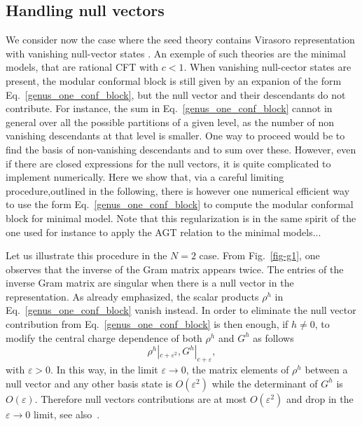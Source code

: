 \documentclass[a4paper,11pt]{article}
\begin{document}
\subsection{Handling null vectors}
\label{null_vec1}
We consider now the case where the seed theory contains Virasoro representation with vanishing null-vector states \cite{BPZ}. 
An exemple of such theories are the minimal models, that are rational CFT with $c<1$.  
When vanishing null-cector states are present, the modular conformal block is  still given by an expanion of the form Eq.~\eqref{genus_one_conf_block}, but the null vector and their descendants do not contribute. For instance,  the sum in Eq.~\eqref{genus_one_conf_block} cannot in general over all the possible partitions of a given level, as the number of non vanishing descendants at that level is smaller. One way to proceed would be to find the basis of non-vanishing descendants and to sum over these. 
However, even if there are closed expressions for the null vectors,  it is quite complicated to implement numerically. 
Here we show that, via a careful limiting  procedure,outlined in the following,  there is however one numerical efficient way to use the form Eq.~\eqref{genus_one_conf_block} to compute the modular conformal block for minimal model.  Note that this regularization is in the same spirit of the one used for instance to apply the AGT relation to the minimal models...



\noindent Let us illustrate this procedure in the $N=2$ case.  From Fig.~\ref{fig-g1}, one observes that the inverse of the Gram matrix appears twice. The  entries of the inverse Gram matrix are singular when there is  a null vector in the representation. As already emphasized, the scalar products $\rho^h$ in Eq.~\eqref{genus_one_conf_block} 
vanish instead. In order to eliminate the null vector contribution from Eq.~\eqref{genus_one_conf_block} is then
enough, if $h\neq0$, to modify the central charge dependence of both 
$\rho^h$ and $G^h$ as follows 
\begin{equation}\label{regularization}
 \rho^h|_{c+\varepsilon^2}, G^h|_{c+\varepsilon},
\end{equation}
with $\varepsilon>0$. In this way, in the limit $\varepsilon\to 0$, the matrix elements of $\rho^h$ between a null vector and any other basis state is $O(\varepsilon^2)$ while the determinant of $G^h$ is $O(\varepsilon)$. Therefore null vectors contributions are at most $O(\varepsilon^2)$ and drop in the $\varepsilon\rightarrow 0$ limit, see also~\cite{SV, Javerzat, Alkalaev}.
\end{document}
